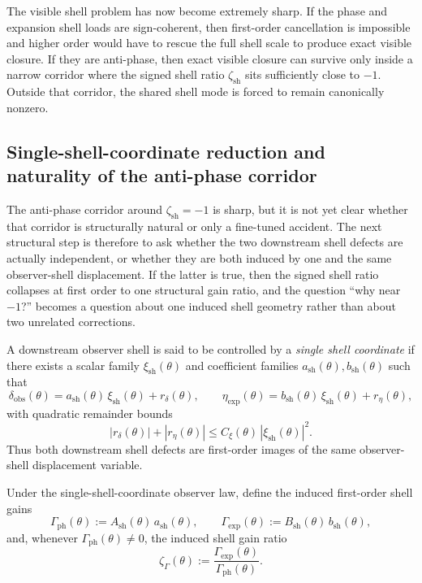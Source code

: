 \begin{remark}
The visible shell problem has now become extremely sharp. If the phase and expansion shell loads are sign-coherent, then first-order cancellation is impossible and higher order would have to rescue the full shell scale to produce exact visible closure. If they are anti-phase, then exact visible closure can survive only inside a narrow corridor where the signed shell ratio $\zeta_{\mathrm{sh}}$ sits sufficiently close to $-1$. Outside that corridor, the shared shell mode is forced to remain canonically nonzero.
\end{remark}



\subsection*{Single-shell-coordinate reduction and naturality of the anti-phase corridor}
The anti-phase corridor around $\zeta_{\mathrm{sh}}=-1$ is sharp, but it is not yet clear whether that corridor is structurally natural or only a fine-tuned accident. The next structural step is therefore to ask whether the two downstream shell defects are actually independent, or whether they are both induced by one and the same observer-shell displacement. If the latter is true, then the signed shell ratio collapses at first order to one structural gain ratio, and the question ``why near $-1$?'' becomes a question about one induced shell geometry rather than about two unrelated corrections.

\begin{definition}
A downstream observer shell is said to be controlled by a \emph{single shell coordinate} if there exists a scalar family $\xi_{\mathrm{sh}}(\theta)$ and coefficient families $a_{\mathrm{sh}}(\theta), b_{\mathrm{sh}}(\theta)$ such that
\[
  \delta_{\mathrm{obs}}(\theta)
  =a_{\mathrm{sh}}(\theta)\,\xi_{\mathrm{sh}}(\theta)+r_{\delta}(\theta),
  \qquad
  \eta_{\mathrm{exp}}(\theta)
  =b_{\mathrm{sh}}(\theta)\,\xi_{\mathrm{sh}}(\theta)+r_{\eta}(\theta),
\]
with quadratic remainder bounds
\[
  |r_{\delta}(\theta)|+|r_{\eta}(\theta)|
  \le C_{\xi}(\theta)\,|\xi_{\mathrm{sh}}(\theta)|^2.
\]
Thus both downstream shell defects are first-order images of the same observer-shell displacement variable.
\end{definition}

\begin{definition}
Under the single-shell-coordinate observer law, define the induced first-order shell gains
\[
  \Gamma_{\mathrm{ph}}(\theta):=A_{\mathrm{sh}}(\theta)\,a_{\mathrm{sh}}(\theta),
  \qquad
  \Gamma_{\mathrm{exp}}(\theta):=B_{\mathrm{sh}}(\theta)\,b_{\mathrm{sh}}(\theta),
\]
and, whenever $\Gamma_{\mathrm{ph}}(\theta)\neq 0$, the induced shell gain ratio
\[
  \zeta_{\Gamma}(\theta):=\frac{\Gamma_{\mathrm{exp}}(\theta)}{\Gamma_{\mathrm{ph}}(\theta)}.
\]
\end{definition}

